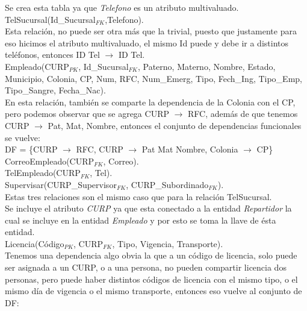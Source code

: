 \documentclass[11pt,letterpaper]{article}
\begin{document}
Se crea esta tabla ya que \textit{Telefono} es un atributo multivaluado.\\

TelSucursal(Id\_Sucursal\(_{FK}\),Telefono).\\

Esta relación, no puede ser otra más que la trivial, puesto que justamente para eso hicimos el atributo multivaluado, el mismo Id puede y debe ir a distintos teléfonos, entonces ID Tel \(\rightarrow\) ID Tel.\\

Empleado(CURP\(_{PK}\), Id\_Sucursal\(_{FK}\), Paterno, Materno, Nombre, Estado, Municipio, Colonia, CP, Num, RFC, Num\_Emerg, Tipo, Fech\_Ing, Tipo\_Emp, Tipo\_Sangre, Fecha\_Nac).\\

En esta relación, también se comparte la dependencia de la Colonia con el CP, pero podemos observar que se agrega CURP \(\rightarrow\) RFC, además de que tenemos CURP \(\rightarrow\) Pat, Mat, Nombre, entonces el conjunto de dependencias funcionales se vuelve:\\

DF = \{CURP \(\rightarrow\) RFC, CURP \(\rightarrow\) Pat Mat Nombre, Colonia \(\rightarrow\) CP\}\\

CorreoEmpleado(CURP\(_{FK}\), Correo). \\

TelEmpleado(CURP\(_{FK}\), Tel).\\

Supervisar(CURP\_Supervisor\(_{FK}\), CURP\_Subordinado\(_{FK}\)).\\

Estas tres relaciones son el mismo caso que para la relación TelSucursal.\\

Se incluye el atributo \textit{CURP} ya que esta conectado a la entidad \textit{Repartidor} la cual se incluye en la entidad \textit{Empleado} y por esto se toma la llave de ésta entidad.\\

Licencia(Código\(_{PK}\), CURP\(_{FK}\), Tipo, Vigencia, Transporte).\\

Tenemos una dependencia algo obvia la que a un código de licencia, solo puede ser asignada a un CURP, o a una persona, no pueden compartir licencia dos personas, pero puede haber distintos códigos de licencia con el mismo tipo, o el mismo día de vigencia o el mismo transporte, entonces eso vuelve al conjunto de DF:\\
\end{document}
